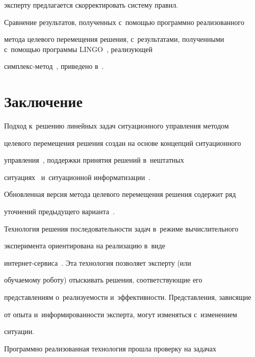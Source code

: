 эксперту предлагается скорректировать сис\-те\-му правил.


  


  Сравнение результатов, полученных с~помощью программно реализованного 


метода целевого перемещения решения, с~результатами, полученными с~по\-мощью программы LINGO~\cite{29-il}, реализующей  


симп\-лекс-ме\-тод~\cite{17-il}, приведено в~\cite{24-il}. 





\section{Заключение}


  


  Подход к~решению линейных задач ситуационного управ\-ле\-ния методом 


целевого перемещения решения создан на основе концепций ситуационного 


управ\-ле\-ния~\cite{13-il, 14-il}, поддержки принятия решений в~нештатных 


ситуациях~\cite{15-il} и~ситуационной информатизации~\cite{16-il}. 


Обновленная версия метода целевого перемещения решения содержит ряд 


уточнений предыдущего варианта~\cite{22-il, 24-il}. 


  


  Технология решения последовательности задач в~режиме вычислительного 


эксперимента ориентирована на реализацию в~виде 


 ин\-тер\-нет-сер\-ви\-са~\cite{12-il}. Эта технология позволяет эксперту (или 


обучаемому роботу) отыскивать решения, соответствующие его 


представлениям о~реализуемости и~эф\-фек\-тив\-ности. Представления, зависящие 


от опыта и~информированности эксперта, могут изменяться с~изменением 


ситуации. 


  


  Программно реализованная технология прошла проверку на задачах 


